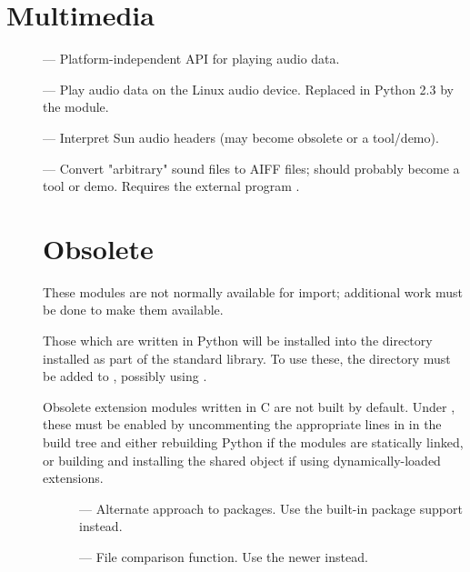 \section{Multimedia}

\begin{description}
\item[]
--- Platform-independent API for playing audio data.

\item[]
--- Play audio data on the Linux audio device.  Replaced in Python 2.3
by the  module.

\item[]
--- Interpret Sun audio headers (may become obsolete or a tool/demo).

\item[]
--- Convert "arbitrary" sound files to AIFF files; should probably
become a tool or demo.  Requires the external program .


\section{Obsolete \label{obsolete-modules}}

These modules are not normally available for import; additional work
must be done to make them available.

Those which are written in Python will be installed into the directory 
 installed as part of the standard library.  To use
these, the directory must be added to , possibly using
.

Obsolete extension modules written in C are not built by default.
Under \UNIX, these must be enabled by uncommenting the appropriate
lines in  in the build tree and either rebuilding
Python if the modules are statically linked, or building and
installing the shared object if using dynamically-loaded extensions.


\begin{description}
\item[]
--- Alternate approach to packages.  Use the built-in package support
instead.

\item[]
--- File comparison function.  Use the newer  instead.


\end{description}
\end{description}
